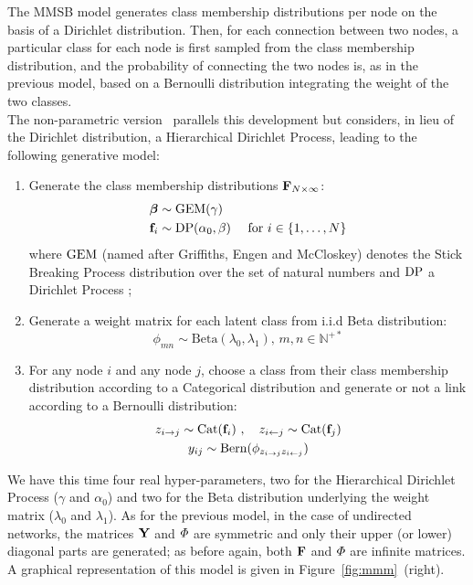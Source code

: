 The MMSB model generates class membership distributions per node on the basis of a Dirichlet distribution. Then, for each connection between two nodes, a particular class for each node is first sampled from the class membership distribution, and the probability of connecting the two nodes is, as in the previous model, based on a Bernoulli distribution integrating the weight of the two classes.
~\\
The non-parametric version \imb\ parallels this development but considers, in lieu of the Dirichlet distribution, a Hierarchical Dirichlet Process, leading to the following generative model:
%
\begin{enumerate}
\item Generate the class membership distributions $\mathbf{F}_{N \times \infty}$:
   \begin{align}
       \bm{\beta} &\sim \mathrm{GEM}(\gamma) \nonumber \\
    \mathbf{f}_i &\sim \mathrm{DP}(\alpha_0, \beta) \quad\textnormal{ for }  i \in \{1, \dotsc, N\} \nonumber
   \end{align}
where $\mathrm{GEM}$ (named after Griffiths, Engen and McCloskey) denotes the Stick Breaking Process distribution over the set of natural numbers and $\mathrm{DP}$ a Dirichlet Process \cite{teh2006hierarchical};
\item Generate a weight matrix for each latent class from i.i.d Beta distribution:\\
\[ \phi_{mn} \sim \mathrm{Beta}(\lambda_0,\lambda_1), \, m,n \in \mathbb{N}^{+*} \]
\item For any node $i$ and any node $j$, choose a class from their class membership distribution according to a Categorical distribution and generate or not a link according to a Bernoulli distribution:
   \begin{gather*}
    z_{i \rightarrow j} \sim \mbox{Cat}(\mathbf{f}_i) \ , \quad z_{i \leftarrow j} \sim \mbox{Cat}(\mathbf{f}_j) \\
    y_{ij} \sim \mathrm{Bern}(\phi_{z_{i \rightarrow j}z_{i \leftarrow j}})
   \end{gather*}
\end{enumerate}
%
We have this time four real hyper-parameters, two for the Hierarchical Dirichlet Process ($\gamma$ and $\alpha_0$) and two for the Beta distribution underlying the weight matrix ($\lambda_0$ and $\lambda_1$). As for the previous model, in the case of undirected networks, the matrices $\mathbf{Y}$ and $\mat{\Phi}$ are symmetric and only their upper (or lower) diagonal parts are generated; as before again, both $\mathbf{F}$ and $\mat{\Phi}$ are infinite matrices. A graphical representation of this model is given in Figure~\ref{fig:mmm}~(right).

